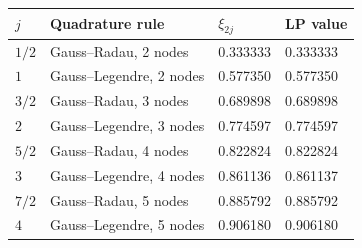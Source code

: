 \begin{ruledtabular}
\begin{tabular}{llll}
$j$ & Quadrature rule & $\xi_{2j}$ & LP value \\
\hline
$1/2$ & Gauss--Radau, 2 nodes & 0.333333 & 0.333333 \\
$1$ & Gauss--Legendre, 2 nodes & 0.577350 & 0.577350 \\
$3/2$ & Gauss--Radau, 3 nodes & 0.689898 & 0.689898 \\
$2$ & Gauss--Legendre, 3 nodes & 0.774597 & 0.774597 \\
$5/2$ & Gauss--Radau, 4 nodes & 0.822824 & 0.822824 \\
$3$ & Gauss--Legendre, 4 nodes & 0.861136 & 0.861137 \\
$7/2$ & Gauss--Radau, 5 nodes & 0.885792 & 0.885792 \\
$4$ & Gauss--Legendre, 5 nodes & 0.906180 & 0.906180 \\
\end{tabular}
\end{ruledtabular}
